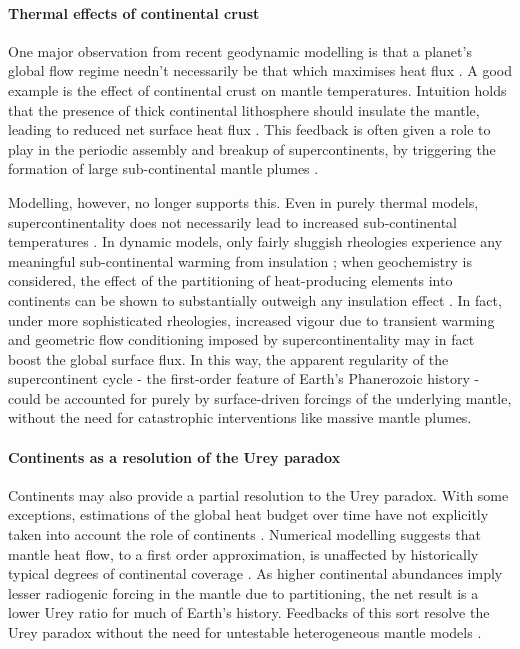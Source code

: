 \documentclass[a4paper,11pt,oneside]{book}
\begin{document}
\paragraph{Thermal effects of continental crust}

One major observation from recent geodynamic modelling is that a planet's global flow regime needn't necessarily be that which maximises heat flux \cite{Grigne2005-nu}. A good example is the effect of continental crust on mantle temperatures. Intuition holds that the presence of thick continental lithosphere should insulate the mantle, leading to reduced net surface heat flux \citet{Korenaga2008-js, Gurnis1988-ks, Anderson1982-dz}. This feedback is often given a role to play in the periodic assembly and breakup of supercontinents, by triggering the formation of large sub-continental mantle plumes \citet{Brandl2013-ta, Yoshida2018-fm}.

Modelling, however, no longer supports this. Even in purely thermal models, supercontinentality does not necessarily lead to increased sub-continental temperatures \cite{Heron2011-kq}. In dynamic models, only fairly sluggish rheologies experience any meaningful sub-continental warming from insulation \citet{Heron2014-zc, ONeill2009-ft}; when geochemistry is considered, the effect of the partitioning of heat-producing elements into continents can be shown to substantially outweigh any insulation effect \cite{Cooper2006-cp}. In fact, under more sophisticated rheologies, increased vigour due to transient warming \cite{Lenardic2005-wn} and geometric flow conditioning imposed by supercontinentality \cite{Zhong2016-bm} may in fact boost the global surface flux. In this way, the apparent regularity of the supercontinent cycle - the first-order feature of Earth's Phanerozoic history - could be accounted for purely by surface-driven forcings of the underlying mantle, without the need for catastrophic interventions like massive mantle plumes.

\paragraph{Continents as a resolution of the Urey paradox}

Continents may also provide a partial resolution to the Urey paradox. With some exceptions, estimations of the global heat budget over time have not explicitly taken into account the role of continents \citet{Conrad2001-ok, Korenaga2008-js}. Numerical modelling suggests that mantle heat flow, to a first order approximation, is unaffected by historically typical degrees of continental coverage \cite{Lenardic2011-rm}. As higher continental abundances imply lesser radiogenic forcing in the mantle due to partitioning, the net result is a lower Urey ratio for much of Earth's history. Feedbacks of this sort resolve the Urey paradox without the need for untestable heterogeneous mantle models \cite{Korenaga2011-ow}.
\end{document}
